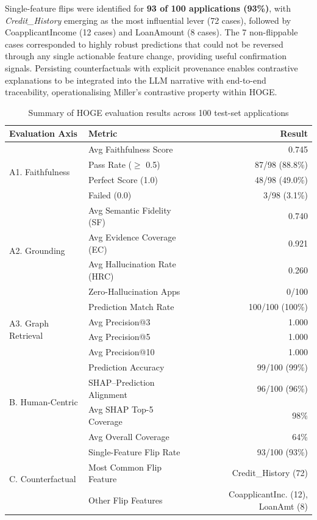\documentclass[lnbip]{svmultln}
\begin{document}
Single-feature flips were identified for \textbf{93 of 100 applications (93\%)}, with \textit{Credit\_History} emerging as the most influential lever (72 cases), followed by CoapplicantIncome (12 cases) and LoanAmount (8 cases). The 7 non-flippable cases corresponded to highly robust predictions that could not be reversed through any single actionable feature change, providing useful confirmation signals. Persisting counterfactuals with explicit provenance enables contrastive explanations to be integrated into the LLM narrative with end-to-end traceability, operationalising Miller's contrastive property within HOGE.

\begin{table}[htp]
    \centering
    \caption{Summary of HOGE evaluation results across 100 test-set applications}
    \label{tab:evalSummary}
    \begin{tabular}{l l r}
        \toprule
        \textbf{Evaluation Axis} & \textbf{Metric} & \textbf{Result} \\
        \midrule
        \multirow{4}{*}{A1. Faithfulness}
            & Avg Faithfulness Score & 0.745 \\
            & Pass Rate ($\geq$ 0.5) & 87/98 (88.8\%) \\
            & Perfect Score (1.0) & 48/98 (49.0\%) \\
            & Failed (0.0) & 3/98 (3.1\%) \\
        \midrule
        \multirow{4}{*}{A2. Grounding}
            & Avg Semantic Fidelity (SF) & 0.740 \\
            & Avg Evidence Coverage (EC) & 0.921 \\
            & Avg Hallucination Rate (HRC) & 0.260 \\
            & Zero-Hallucination Apps & 0/100 \\
        \midrule
        \multirow{4}{*}{A3. Graph Retrieval}
            & Prediction Match Rate & 100/100 (100\%) \\
            & Avg Precision@3 & 1.000 \\
            & Avg Precision@5 & 1.000 \\
            & Avg Precision@10 & 1.000 \\
        \midrule
        \multirow{4}{*}{B. Human-Centric}
            & Prediction Accuracy & 99/100 (99\%) \\
            & SHAP--Prediction Alignment & 96/100 (96\%) \\
            & Avg SHAP Top-5 Coverage & 98\% \\
            & Avg Overall Coverage & 64\% \\
        \midrule
        \multirow{3}{*}{C. Counterfactual}
            & Single-Feature Flip Rate & 93/100 (93\%) \\
            & Most Common Flip Feature & Credit\_History (72) \\
            & Other Flip Features & CoapplicantInc. (12), LoanAmt (8) \\
        \bottomrule
    \end{tabular}
\end{table}
\end{document}
